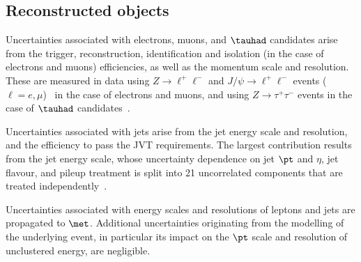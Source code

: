 \subsection{Reconstructed objects}
\label{sec:syst_objects}


Uncertainties associated with electrons, muons, and $\tauhad$ candidates arise from the trigger, reconstruction,  
identification and isolation (in the case of electrons and muons) efficiencies, as well as the momentum scale and resolution. 
These are measured in data using $Z\to \ell^+\ell^-$ and $J/\psi\to \ell^+\ell^-$ events ($\ell =e, \mu$)~\cite{ATLAS-CONF-2016-024,Aad:2016jkr} 
in the case of electrons and muons, and using $Z\to \tau^+\tau^-$ events in the case of $\tauhad$ candidates~\cite{ATLAS-CONF-2017-029}.

Uncertainties associated with jets arise from the jet energy scale
and resolution, and the efficiency to pass the JVT requirements. 
The largest contribution results from the jet energy scale,
whose uncertainty dependence on jet $\pt$ and $\eta$, jet flavour, and pileup treatment is split into 21 uncorrelated components 
that are treated independently~\cite{Aaboud:2017jcu}.  

Uncertainties associated with energy scales and resolutions of leptons and jets 
are propagated to $\met$. Additional uncertainties originating from the modelling 
of the underlying event, in particular its impact on the $\pt$ scale and resolution 
of unclustered energy, are negligible.

